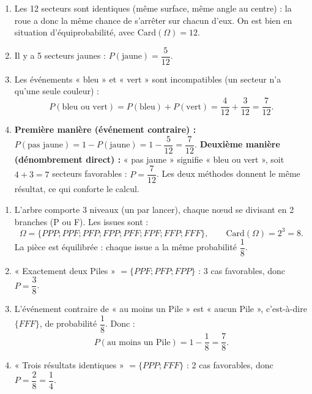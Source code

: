 \documentclass[11pt]{article}
\begin{document}
\begin{corrige}
\begin{enumerate}
\item Les 12 secteurs sont identiques (même surface, même angle au centre) : la roue a donc la même chance de s'arrêter sur chacun d'eux. On est bien en situation d'équiprobabilité, avec $\text{Card}(\Omega) = 12$.
\item Il y a 5 secteurs jaunes : $P(\text{jaune}) = \dfrac{5}{12}$.
\item Les événements « bleu » et « vert » sont incompatibles (un secteur n'a qu'une seule couleur) :
\[P(\text{bleu ou vert}) = P(\text{bleu}) + P(\text{vert}) = \frac{4}{12} + \frac{3}{12} = \frac{7}{12}.\]
\item \textbf{Première manière (événement contraire) :} $P(\text{pas jaune}) = 1 - P(\text{jaune}) = 1 - \dfrac{5}{12} = \dfrac{7}{12}$.
\textbf{Deuxième manière (dénombrement direct) :} « pas jaune » signifie « bleu ou vert », soit $4 + 3 = 7$ secteurs favorables : $P = \dfrac{7}{12}$. Les deux méthodes donnent le même résultat, ce qui conforte le calcul.
\end{enumerate}
\end{corrige}

\begin{corrige}
\begin{enumerate}
\item L'arbre comporte 3 niveaux (un par lancer), chaque nœud se divisant en 2 branches (P ou F). Les issues sont :
\[\Omega = \{PPP ; PPF ; PFP ; FPP ; PFF ; FPF ; FFP ; FFF\}, \qquad \text{Card}(\Omega) = 2^3 = 8.\]
La pièce est équilibrée : chaque issue a la même probabilité $\dfrac{1}{8}$.
\item « Exactement deux Piles » $= \{PPF ; PFP ; FPP\}$ : 3 cas favorables, donc $P = \dfrac{3}{8}$.
\item L'événement contraire de « au moins un Pile » est « aucun Pile », c'est-à-dire $\{FFF\}$, de probabilité $\dfrac{1}{8}$. Donc :
\[P(\text{au moins un Pile}) = 1 - \frac{1}{8} = \frac{7}{8}.\]
\item « Trois résultats identiques » $= \{PPP ; FFF\}$ : 2 cas favorables, donc $P = \dfrac{2}{8} = \dfrac{1}{4}$.
\end{enumerate}
\end{corrige}
\end{document}
